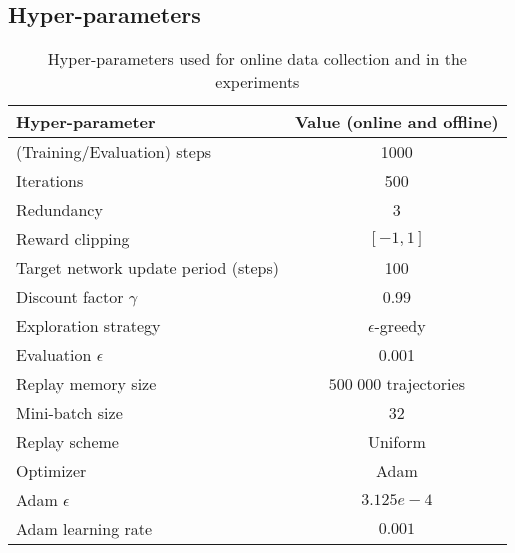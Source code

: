 \subsection{Hyper-parameters}\label{sec:appendix_hparams}
\begin{table*}
\centering
\caption{Hyper-parameters used for online data collection and in the experiments}\label{table:hyperp}
\begin{tabular}{lcc}
\toprule
Hyper-parameter                      & \multicolumn{2}{c}{Value (online and offline)}             \\
\hline
(Training/Evaluation) steps          & \multicolumn{2}{c}{1000}                                   \\
Iterations                           & \multicolumn{2}{c}{500}                                    \\
Redundancy                           & \multicolumn{2}{c}{3}                                      \\
Reward clipping                      & \multicolumn{2}{c}{$[-1,1]$}                               \\
Target network update period (steps) & \multicolumn{2}{c}{100}                                    \\
Discount factor $\gamma$             & \multicolumn{2}{c}{0.99}                                   \\
Exploration strategy                 & \multicolumn{2}{c}{$\epsilon$-greedy}                      \\
Evaluation $\epsilon$                & \multicolumn{2}{c}{0.001}                                  \\
Replay memory size                   & \multicolumn{2}{c}{$500\; 000$ trajectories}               \\
Mini-batch size                      & \multicolumn{2}{c}{32}                                     \\
Replay scheme                        & \multicolumn{2}{c}{Uniform}                                \\
Optimizer                            & \multicolumn{2}{c}{Adam}                                   \\
Adam $\epsilon$                      & \multicolumn{2}{c}{$3.125e-4$}                             \\
Adam learning rate                   & \multicolumn{2}{c}{$0.001$}                                \\

\end{tabular}
\end{table*}
